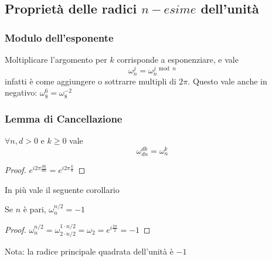 \subsection{Proprietà delle radici $n-esime$ dell'unità}

\subsubsection{Modulo dell'esponente}

Moltiplicare l'argomento per $k$ corrisponde a esponenziare, e vale
\begin{equation*}
    \omega_n^j = \omega_n^{j \bmod n}
\end{equation*}
infatti è come aggiungere o sottrarre multipli di $2\pi$. Questo vale anche in negativo: $\omega_8^{6} = \omega_8^{-2} $

\subsubsection{Lemma di Cancellazione}
\begin{lemma}
    $\forall n, d > 0$ e $k \geq 0$ vale 
    \begin{equation*}
        \omega_{dn}^{dk} = \omega_n^k
    \end{equation*}
    \label{teo:cancellazione}
\end{lemma}
\begin{proof}
    $e^{i 2 \pi \frac{dk}{dn}} = e^{i 2 \pi \frac{k}{n}}$
\end{proof}
In più vale il seguente corollario
\begin{lemma}
    Se $n$ è pari, $ \omega_{n}^{n/2} =-1 $
\end{lemma}
\begin{proof}
    $ \omega_{n}^{n/2} =
    \omega_{2 \cdot n/2}^{1 \cdot n/2} =
    \omega_{2} =
    e^{i \frac{2 \pi}{2}} = -1
    $
\end{proof}
Nota: la radice principale quadrata dell'unità è $-1$

